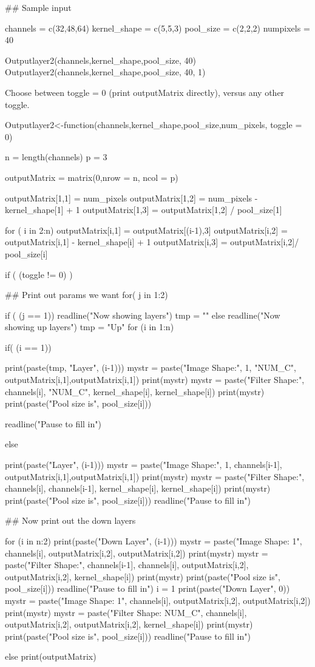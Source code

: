 
## Sample input

channels = c(32,48,64)
kernel_shape = c(5,5,3)
pool_size = c(2,2,2)
numpixels = 40

Outputlayer2(channels,kernel_shape,pool_size, 40)
Outputlayer2(channels,kernel_shape,pool_size, 40, 1)

Choose between toggle = 0 (print outputMatrix directly), versus any other toggle.



Outputlayer2<-function(channels,kernel_shape,pool_size,num_pixels, toggle = 0){

  n = length(channels)
  p = 3
  
  outputMatrix = matrix(0,nrow = n, ncol = p)
  
  outputMatrix[1,1] = num_pixels
  outputMatrix[1,2] = num_pixels - kernel_shape[1] + 1
  outputMatrix[1,3] = outputMatrix[1,2] / pool_size[1]
  
  for ( i in 2:n){
    outputMatrix[i,1] = outputMatrix[(i-1),3]     
    outputMatrix[i,2] = outputMatrix[i,1] - kernel_shape[i] + 1
    outputMatrix[i,3] = outputMatrix[i,2]/ pool_size[i]
  }

if ( (toggle != 0) ){
  ## Print out params we want
    for( j in 1:2){
    
    if ( (j == 1)){
      readline("Now showing layers")
      tmp = ""
    } else {
      readline("Now showing up layers")
      tmp = "Up"
    }
    for (i in 1:n){
      if( (i == 1)){
    
      print(paste(tmp, "Layer", (i-1)))
      mystr = paste("Image Shape:", 1, "NUM_C", outputMatrix[i,1],outputMatrix[i,1])
      print(mystr)
      mystr = paste("Filter Shape:", channels[i], "NUM_C", kernel_shape[i], kernel_shape[i])
      print(mystr) 
      print(paste("Pool size is", pool_size[i]))
    
      readline("Pause to fill in")
      } else {
    
      print(paste("Layer", (i-1)))
      mystr = paste("Image Shape:", 1, channels[i-1], outputMatrix[i,1],outputMatrix[i,1])
      print(mystr)
      mystr = paste("Filter Shape:", channels[i], channels[i-1], kernel_shape[i], kernel_shape[i])
      print(mystr) 
      print(paste("Pool size is", pool_size[i]))
      readline("Pause to fill in")    
      }
  
    }
    }
  ## Now print out the down layers
  
  for (i in n:2){
    print(paste("Down Layer", (i-1)))  
    mystr = paste("Image Shape: 1", channels[i], outputMatrix[i,2], outputMatrix[i,2])
    print(mystr)
    mystr = paste("Filter Shape:", channels[i-1], channels[i], outputMatrix[i,2], outputMatrix[i,2], kernel_shape[i])
    print(mystr) 
    print(paste("Pool size is", pool_size[i]))
    readline("Pause to fill in")  
  } 
  i = 1
  print(paste("Down Layer", 0))
  mystr = paste("Image Shape: 1", channels[i], outputMatrix[i,2], outputMatrix[i,2])
  print(mystr)    
  mystr = paste("Filter Shape: NUM_C", channels[i], outputMatrix[i,2], outputMatrix[i,2], kernel_shape[i])
  print(mystr) 
  print(paste("Pool size is", pool_size[i]))
  readline("Pause to fill in")    
  
  } else {
    print(outputMatrix)
  }
}